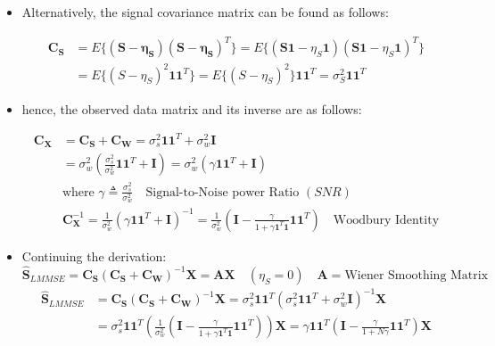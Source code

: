 \begin{itemize}
\item Alternatively, the signal covariance matrix can be found as follows:

\begin{align*}
\mathbf{C}_{\mathbf{S}} &= E\{(\mathbf{S} - \boldsymbol{\eta}_{\mathbf{S}})(\mathbf{S} - \boldsymbol{\eta}_{\mathbf{S}})^T\} = E\{(\mathbf{S}\mathbf{1} - \eta_{S}\mathbf{1})(\mathbf{S}\mathbf{1} - \eta_{S}\mathbf{1})^T\} \\[8pt]
&= E\{(S - \eta_{S})^2 \mathbf{1}\mathbf{1}^T\} = E\{(S - \eta_{S})^2\} \mathbf{1}\mathbf{1}^T = \sigma_{S}^2 \mathbf{1}\mathbf{1}^T
\end{align*}
\item hence, the observed data matrix and its inverse are as follows:

\begin{align*}
\mathbf{C}_{\mathbf{X}} &= \mathbf{C}_{\mathbf{S}} + \mathbf{C}_{\mathbf{W}} = \sigma_{s}^2 \mathbf{1}\mathbf{1}^T + \sigma_{w}^2 \mathbf{I} \\[8pt]
&= \sigma_{w}^2 \left( \frac{\sigma_{s}^2}{\sigma_{w}^2} \mathbf{1}\mathbf{1}^T + \mathbf{I} \right) = \sigma_{w}^2 (\gamma \mathbf{1}\mathbf{1}^T + \mathbf{I})\\[8pt]
&\text{where } \gamma \triangleq \frac{\sigma_{s}^2}{\sigma_{w}^2} \quad \text{Signal-to-Noise power Ratio } (SNR)\\[8pt]
&\mathbf{C}_{\mathbf{X}}^{-1} = \frac{1}{\sigma_{w}^2} (\gamma \mathbf{1}\mathbf{1}^T + \mathbf{I})^{-1} = \frac{1}{\sigma_{w}^2} \left( \mathbf{I} - \frac{\gamma}{1+\gamma \mathbf{1}^T \mathbf{1}} \mathbf{1}\mathbf{1}^T \right) \quad \text{Woodbury Identity}
\end{align*}
\item Continuing the derivation:
$$
\boxed{\mathbf{\hat{S}}_{LMMSE} = \mathbf{C}_{\mathbf{S}}(\mathbf{C}_{\mathbf{S}} + \mathbf{C}_{\mathbf{W}})^{-1}\mathbf{X} = \mathbf{A}\mathbf{X} \quad (\eta_{S}=0) \quad \mathbf{A} = \text{Wiener Smoothing Matrix}}
$$
\vspace{-0.25em}
\begin{align*}
\mathbf{\hat{S}}_{LMMSE} &= \mathbf{C}_{\mathbf{S}}(\mathbf{C}_{\mathbf{S}} + \mathbf{C}_{\mathbf{W}})^{-1}\mathbf{X} = \sigma_{s}^2 \mathbf{1}\mathbf{1}^T (\sigma_{s}^2 \mathbf{1}\mathbf{1}^T + \sigma_{w}^2 \mathbf{I})^{-1} \mathbf{X} \\[8pt]
&= \sigma_{s}^2 \mathbf{1}\mathbf{1}^T \left( \frac{1}{\sigma_{w}^2} \left( \mathbf{I} - \frac{\gamma}{1+\gamma \mathbf{1}^T \mathbf{1}} \mathbf{1}\mathbf{1}^T \right) \right) \mathbf{X} = \gamma \mathbf{1}\mathbf{1}^T \left( \mathbf{I} - \frac{\gamma}{1+N\gamma} \mathbf{1}\mathbf{1}^T \right) \mathbf{X} \\[8pt]

\end{align*}
\end{itemize}
